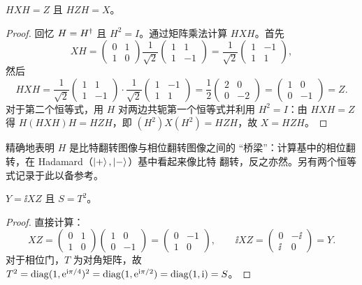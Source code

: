 \begin{lemma}[Hadamard 共轭]\label{lem:lec01-conj}
$H X H = Z$ 且 $H Z H = X$。
\end{lemma}

\begin{proof}
回忆 $H=H^{\dagger}$ 且 $H^{2}=I$。通过矩阵乘法计算 $HXH$。首先
\[
  XH=\begin{pmatrix}0&1\\1&0\end{pmatrix}
     \frac{1}{\sqrt2}\begin{pmatrix}1&1\\1&-1\end{pmatrix}
    =\frac{1}{\sqrt2}\begin{pmatrix}1&-1\\1&1\end{pmatrix},
\]
然后
\[
  HXH=\frac{1}{\sqrt2}\begin{pmatrix}1&1\\1&-1\end{pmatrix}\cdot
      \frac{1}{\sqrt2}\begin{pmatrix}1&-1\\1&1\end{pmatrix}
     =\frac{1}{2}\begin{pmatrix}2&0\\0&-2\end{pmatrix}
     =\begin{pmatrix}1&0\\0&-1\end{pmatrix}=Z.
\]
对于第二个恒等式，用 $H$ 对两边共轭第一个恒等式并利用 $H^{2}=I$：由
$HXH=Z$ 得 $H(HXH)H=HZH$，即 $(H^{2})X(H^{2})=HZH$，故 $X=HZH$。
\end{proof}

 精确地表明 $H$ 是比特翻转图像与相位翻转图像之间的
``桥梁''：计算基中的相位翻转，在 Hadamard（$\ket{+},\ket{-}$）基中看起来像比特
翻转，反之亦然。另有两个恒等式记录于此以备参考。

\begin{proposition}\label{prop:lec01-yxz}
$Y=\ii XZ$ 且 $S=T^{2}$。
\end{proposition}

\begin{proof}
直接计算：
\[
  XZ=\begin{pmatrix}0&1\\1&0\end{pmatrix}
     \begin{pmatrix}1&0\\0&-1\end{pmatrix}
    =\begin{pmatrix}0&-1\\1&0\end{pmatrix},\qquad
  \ii XZ=\begin{pmatrix}0&-\ii\\\ii&0\end{pmatrix}=Y.
\]
对于相位门，$T$ 为对角矩阵，故 $T^{2}=\operatorname{diag}(1,\mathrm{e}^{\mathrm{i}\pi/4})^{2}=\operatorname{diag}(1,\mathrm{e}^{\mathrm{i}\pi/2})=\operatorname{diag}(1,\mathrm{i})=S$。
\end{proof}

